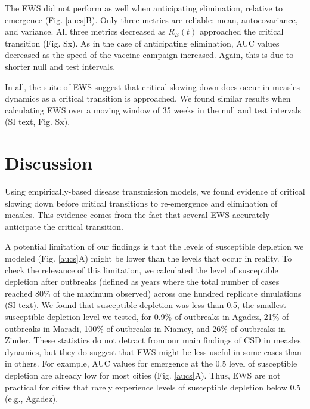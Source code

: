 \documentclass[3p]{elsarticle} %
\begin{document}
The EWS did not perform as well when anticipating elimination, relative
to emergence (Fig. \ref{aucs}B). Only three metrics are reliable: mean,
autocovariance, and variance. All three metrics decreased as \(R_E(t)\)
approached the critical transition (Fig. Sx). As in the case of
anticipating elimination, AUC values decreased as the speed of the
vaccine campaign increased. Again, this is due to shorter null and test
intervals.

In all, the suite of EWS suggest that critical slowing down does occur
in measles dynamics as a critical transition is approached. We found
similar results when calculating EWS over a moving window of 35 weeks in
the null and test intervals (SI text, Fig. Sx).

\section{Discussion}\label{discussion}

Using empirically-based disease transmission models, we found evidence
of critical slowing down before critical transitions to re-emergence and
elimination of measles. This evidence comes from the fact that several
EWS accurately anticipate the critical transition.

A potential limitation of our findings is that the levels of susceptible
depletion we modeled (Fig. \ref{aucs}A) might be lower than the levels
that occur in reality. To check the relevance of this limitation, we
calculated the level of susceptible depletion after outbreaks (defined
as years where the total number of cases reached 80\% of the maximum
observed) across one hundred replicate simulations (SI text). We found
that susceptible depletion was less than 0.5, the smallest susceptible
depletion level we tested, for 0.9\% of outbreaks in Agadez, 21\% of
outbreaks in Maradi, 100\% of outbreaks in Niamey, and 26\% of outbreaks
in Zinder. These statistics do not detract from our main findings of CSD
in measles dynamics, but they do suggest that EWS might be less useful
in some cases than in others. For example, AUC values for emergence at
the 0.5 level of susceptible depletion are already low for most cities
(Fig. \ref{aucs}A). Thus, EWS are not practical for cities that rarely
experience levels of susceptible depletion below 0.5 (e.g., Agadez).
\end{document}
